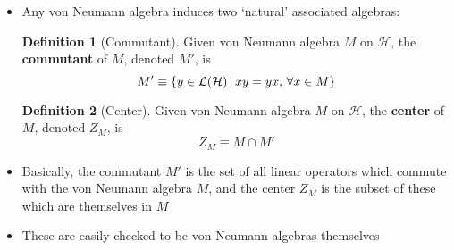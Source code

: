 \documentclass[12pt,a4paper]{article}
\numberwithin{equation}{section}
\theoremstyle{definition}
\newtheorem{definition}{Definition}[section]
\theoremstyle{theorem}
\begin{document}
\begin{itemize}
		\item Any von Neumann algebra induces two `natural' associated algebras:
		\begin{definition}[Commutant]
			Given von Neumann algebra $M$ on $\mathcal{H}$, the \textbf{commutant} of $M$, denoted $M'$, is
			\begin{equation}
				M'\equiv\left\{y\in\mathcal{L}(\mathcal{H})\,|\,xy=yx,\,\forall x\in M\right\}
			\end{equation}
		\end{definition}
		\begin{definition}[Center]
			Given von Neumann algebra $M$ on $\mathcal{H}$, the \textbf{center} of $M$, denoted $Z_{M}$, is
			\begin{equation}
				Z_{M}\equiv M\cap M'
			\end{equation}
		\end{definition}
		\item Basically, the commutant $M'$ is the set of all linear operators which commute with the von Neumann algebra $M$, and the center $Z_{M}$ is the subset of these which are themselves in $M$
		\item These are easily checked to be von Neumann algebras themselves
	\end{itemize}
\end{document}
